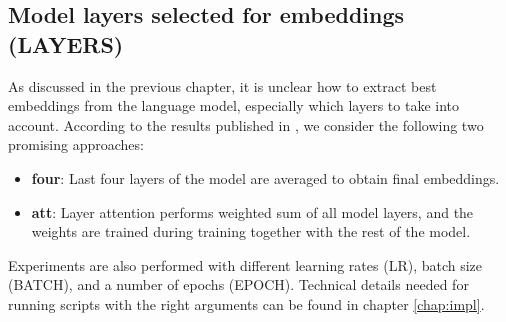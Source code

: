 
\subsection{Model layers selected for embeddings (LAYERS)}
As discussed in the previous chapter, it is unclear how to extract best embeddings from the language model, especially which layers to take into account. According to the results published in \citep{Devlin2019, Kondratyuk2019}, we consider the following two promising approaches:
\begin{itemize}
\item \textbf{four}: Last four layers of the model are averaged to obtain final embeddings.
\item \textbf{att}: Layer attention performs weighted sum of all model layers, and the weights are trained during training together with the rest of the model.
\end{itemize}
Experiments are also performed with different learning rates (LR), batch size (BATCH), and a number of epochs (EPOCH). 
Technical details needed for running scripts with the right arguments can be found in chapter \ref{chap:impl}.

